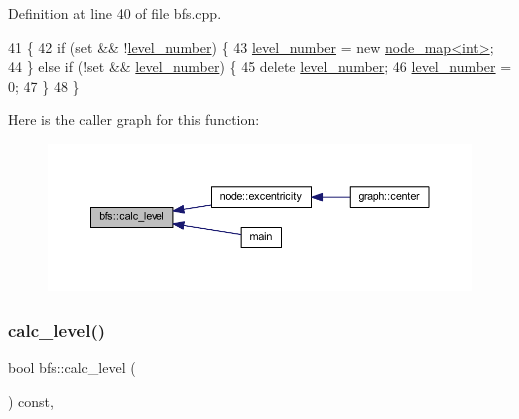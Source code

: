 Definition at line 40 of file bfs.\+cpp.


\begin{DoxyCode}
41 \{
42     \textcolor{keywordflow}{if} (\textcolor{keyword}{set} && !\mbox{\hyperlink{classbfs_aab92e9d128612c28324aafe4750dbc84}{level\_number}}) \{
43     \mbox{\hyperlink{classbfs_aab92e9d128612c28324aafe4750dbc84}{level\_number}} = \textcolor{keyword}{new} \mbox{\hyperlink{classnode__map}{node\_map<int>}};
44     \} \textcolor{keywordflow}{else} \textcolor{keywordflow}{if} (!\textcolor{keyword}{set} && \mbox{\hyperlink{classbfs_aab92e9d128612c28324aafe4750dbc84}{level\_number}}) \{
45     \textcolor{keyword}{delete} \mbox{\hyperlink{classbfs_aab92e9d128612c28324aafe4750dbc84}{level\_number}};
46     \mbox{\hyperlink{classbfs_aab92e9d128612c28324aafe4750dbc84}{level\_number}} = 0;
47     \}
48 \}
\end{DoxyCode}
Here is the caller graph for this function\+:
\nopagebreak
\begin{figure}[H]
\begin{center}
\leavevmode
\includegraphics[width=350pt]{classbfs_a491515da4eb8efca0be4fef0df350a8e_icgraph}
\end{center}
\end{figure}
\mbox{\label{classbfs_a78ea23abb1461e62dd7ecd416fecbd96}} 
\subsubsection{\texorpdfstring{calc\+\_\+level()}{calc\_level()}\hspace{0.1cm}{\footnotesize\ttfamily [2/2]}}
{\footnotesize\ttfamily bool bfs\+::calc\+\_\+level (\begin{DoxyParamCaption}{ }\end{DoxyParamCaption}) const\hspace{0.3cm}{\ttfamily [inline]}, {\ttfamily [inherited]}}



